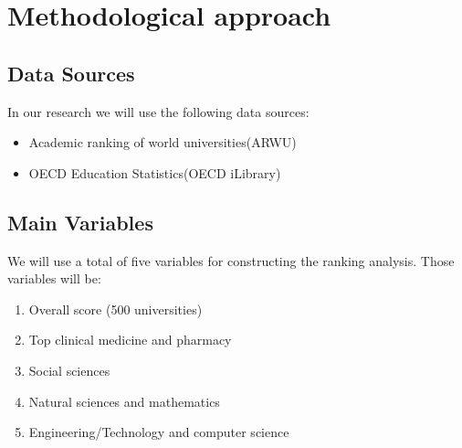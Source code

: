 \section{Methodological approach}\label{sec:approach}

\subsection{Data Sources}

In our research we will use the following data sources:

\begin{itemize}
	\item Academic ranking of world universities(ARWU)
	\item OECD Education Statistics(OECD iLibrary)\cite{oecd}
\end{itemize}

\subsection{Main Variables}
We will use a total of five variables for constructing the ranking analysis. Those variables will be:
\begin{enumerate}
	\item Overall score (500 universities)
	\item Top clinical medicine and pharmacy
	\item Social sciences
	\item Natural sciences and mathematics
	\item Engineering/Technology and computer science
\end{enumerate}

